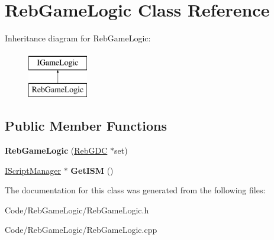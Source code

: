 \hypertarget{class_reb_game_logic}{}\section{Reb\+Game\+Logic Class Reference}
\label{class_reb_game_logic}
Inheritance diagram for Reb\+Game\+Logic\+:\begin{figure}[H]
\begin{center}
\leavevmode
\includegraphics[height=2.000000cm]{class_reb_game_logic}
\end{center}
\end{figure}
\subsection*{Public Member Functions}
\begin{DoxyCompactItemize}
\item 
{\bfseries Reb\+Game\+Logic} (\hyperlink{class_reb_g_d_c}{Reb\+G\+DC} $\ast$set)\hypertarget{class_reb_game_logic_a46b612f497f76e0a200db59bea1ee89d}{}\label{class_reb_game_logic_a46b612f497f76e0a200db59bea1ee89d}

\item 
\hyperlink{class_i_script_manager}{I\+Script\+Manager} $\ast$ {\bfseries Get\+I\+SM} ()\hypertarget{class_reb_game_logic_a939ddfc5e0b54f20168796b2a94aa891}{}\label{class_reb_game_logic_a939ddfc5e0b54f20168796b2a94aa891}

\end{DoxyCompactItemize}


The documentation for this class was generated from the following files\+:\begin{DoxyCompactItemize}
\item 
Code/\+Reb\+Game\+Logic/Reb\+Game\+Logic.\+h\item 
Code/\+Reb\+Game\+Logic/Reb\+Game\+Logic.\+cpp\end{DoxyCompactItemize}
